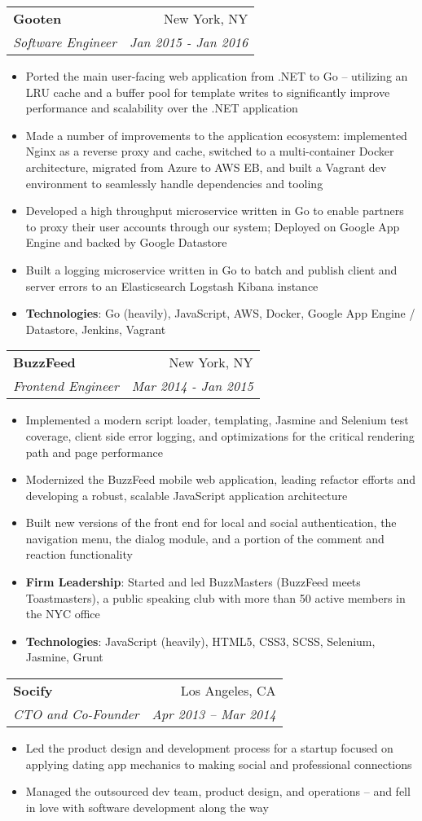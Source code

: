 \documentclass[letterpaper,11pt]{article}
\makeatletter
\newcommand{\resumeItem}[2]{
  \item\small{
    \textbf{#1}{: #2 \vspace{-1.5pt}}
  }
}
\newcommand{\resumeItemSimple}[1]{
  \item\small{
    {#1 \vspace{-1.5pt}}
  }
}
\newcommand{\resumeSubheading}[4]{
  \vspace{-1pt}\item
    \begin{tabular*}{0.97\textwidth}[t]{l@{\extracolsep{\fill}}r}
      \textbf{#1} & #2 \\
      \textit{\small#3} & \textit{\small #4} \\
    \end{tabular*}\vspace{-5pt}
}
\newcommand{\resumeItemListStart}{\begin{itemize}}
\newcommand{\resumeItemListEnd}{\end{itemize}\vspace{-5pt}}
\makeatother
\begin{document}
    \resumeSubheading
      {Gooten}{New York, NY}
      {Software Engineer}{Jan 2015 - Jan 2016}
      \resumeItemListStart
        \resumeItemSimple
          {Ported the main user-facing web application from .NET to Go -- utilizing an LRU cache and a buffer pool for template writes to significantly improve performance and scalability over the .NET application}
        \resumeItemSimple
          {Made a number of improvements to the application ecosystem: implemented Nginx as a reverse proxy and cache, switched to a multi-container Docker architecture, migrated from Azure to AWS EB, and built a Vagrant dev environment to seamlessly handle dependencies and tooling}
        \resumeItemSimple
          {Developed a high throughput microservice written in Go to enable partners to proxy their user accounts through our system; Deployed on Google App Engine and backed by Google Datastore}
        \resumeItemSimple
          {Built a logging microservice written in Go to batch and publish client and server errors to an Elasticsearch Logstash Kibana instance}
        \resumeItem{Technologies}
        {Go (heavily), JavaScript, AWS, Docker, Google App Engine / Datastore, Jenkins, Vagrant}
      \resumeItemListEnd

    \resumeSubheading
      {BuzzFeed}{New York, NY}
      {Frontend Engineer}{Mar 2014 - Jan 2015}
      \resumeItemListStart
        \resumeItemSimple
          {Implemented a modern script loader, templating, Jasmine and Selenium test coverage, client side error logging, and optimizations for the critical rendering path and page performance}
        \resumeItemSimple
          {Modernized the BuzzFeed mobile web application, leading refactor efforts and developing a robust, scalable JavaScript application architecture}
        \resumeItemSimple
          {Built new versions of the front end for local and social authentication, the navigation menu, the dialog module, and a portion of the comment and reaction functionality}
        \resumeItem{Firm Leadership}
          {Started and led BuzzMasters (BuzzFeed meets Toastmasters), a public speaking club with more than 50 active members in the NYC office}
        \resumeItem{Technologies}
        {JavaScript (heavily), HTML5, CSS3, SCSS, Selenium, Jasmine, Grunt}
      \resumeItemListEnd
      
    \resumeSubheading
      {Socify}{Los Angeles, CA}
      {CTO and Co-Founder}{Apr 2013 – Mar 2014}
      \resumeItemListStart
        \resumeItemSimple
          {Led the product design and development process for a startup focused on applying dating app mechanics to making social and professional connections}
        \resumeItemSimple
          {Managed the outsourced dev team, product design, and operations -- and fell in love with software development along the way}
      \resumeItemListEnd
\end{document}
